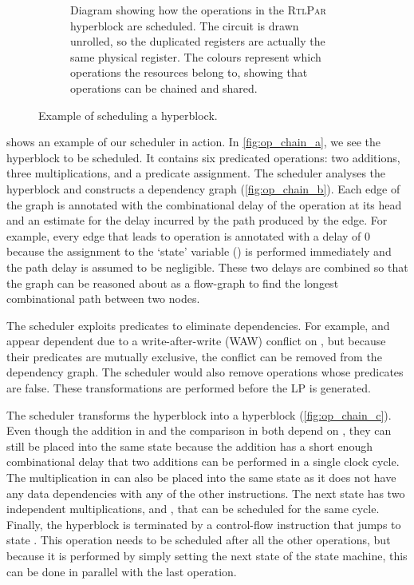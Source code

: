 \begin{figure*}
\begin{subfigure}[b]{0.61\linewidth}
\begin{tikzpicture}[very thick,scale=0.72,transform shape]
\end{tikzpicture}
      \caption{Diagram showing how the operations in the \textsc{RtlPar} hyperblock are scheduled.  The circuit is drawn unrolled, so the duplicated registers are actually the same physical register. The colours represent which operations the resources belong to, showing that operations can be chained and shared.}%
      \label{fig:op_chain_d}
    \end{subfigure}
  \caption{Example of scheduling a hyperblock.}%
  \label{fig:op_chain}
\end{figure*}

 shows an example of our scheduler in action. In
\cref{fig:op_chain_a}, we see the \rtlblock{} hyperblock to be scheduled. It
contains six predicated operations: two additions, three
multiplications, and a predicate assignment.
The scheduler analyses the hyperblock and constructs a dependency graph
(\cref{fig:op_chain_b}). Each edge of the graph is annotated with the
combinational delay of the operation at its head and an estimate for
  the delay incurred by the path produced by the edge. For
example, every edge that leads to operation \sVII{}  is
annotated with a delay of 0 because the assignment to the `state' variable
() is performed immediately and the path delay is
  assumed to be negligible.  These two delays are combined so that the
  graph can be reasoned about as a flow-graph to find the longest combinational
  path between two nodes.

The scheduler exploits predicates to eliminate dependencies. For example, \sIII{} and \sIV{} appear dependent due to a write-after-write (WAW) conflict on , but
because their predicates are mutually exclusive, the conflict can be removed
from the dependency graph. The scheduler would also remove operations whose predicates are false.  These transformations are performed before the \gls{LP} is generated.

The scheduler transforms the \rtlblock{} hyperblock into a \rtlpar{}
hyperblock (\cref{fig:op_chain_c}). Even though the addition in \sII{}
and the comparison in \sVI{} both depend on \sI{}, they can still be placed
into the same state because the addition has a short enough
combinational delay that two additions can be performed in a single clock cycle.
The multiplication in \sIII{} can also be placed into the
same state as it does not have any data dependencies with any of the other
instructions.  The next state has two independent
multiplications, \sIV{} and \sV{}, that can be scheduled for the same cycle. Finally, the hyperblock is terminated by a control-flow
instruction that jumps to state .  This operation needs
to be scheduled after all the other operations, but because it
is performed by simply setting the next state of the state machine, this can be done in parallel with the last operation.

